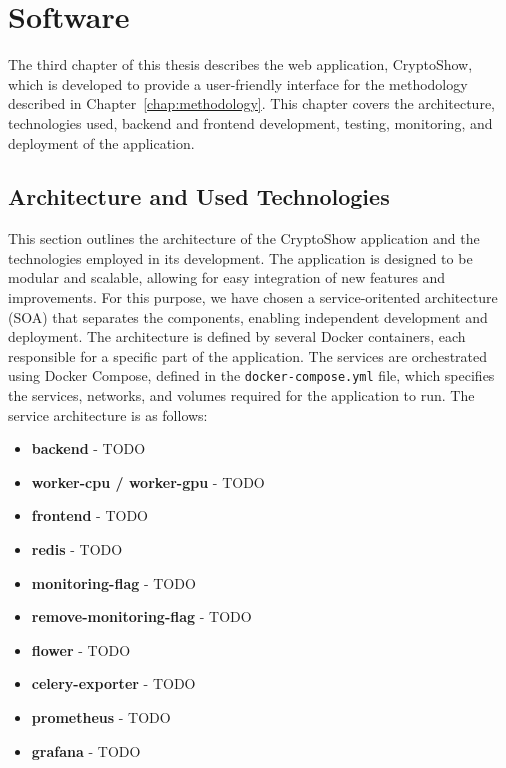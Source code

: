 \chapter{Software}
\label{chap:software}

The third chapter of this thesis describes the web application, CryptoShow, which is developed to provide a user-friendly interface for the methodology described in Chapter~\ref{chap:methodology}. This chapter covers the architecture, technologies used, backend and frontend development, testing, monitoring, and deployment of the application.

\section{Architecture and Used Technologies}
\label{sec:architecture-technologies}

This section outlines the architecture of the CryptoShow application and the technologies employed in its development. The application is designed to be modular and scalable, allowing for easy integration of new features and improvements. For this purpose, we have chosen a service-oritented architecture (SOA) that separates the components, enabling independent development and deployment. The architecture is defined by several Docker containers, each responsible for a specific part of the application. The services are orchestrated using Docker Compose, defined in the \texttt{docker-compose.yml} file, which specifies the services, networks, and volumes required for the application to run. The service architecture is as follows:

\begin{itemize}
    \item \textbf{backend} - TODO
    \item \textbf{worker-cpu / worker-gpu} - TODO
    \item \textbf{frontend} - TODO
    \item \textbf{redis} - TODO
    \item \textbf{monitoring-flag} - TODO
    \item \textbf{remove-monitoring-flag} - TODO
    \item \textbf{flower} - TODO
    \item \textbf{celery-exporter} - TODO
    \item \textbf{prometheus} - TODO
    \item \textbf{grafana} - TODO
\end{itemize}

